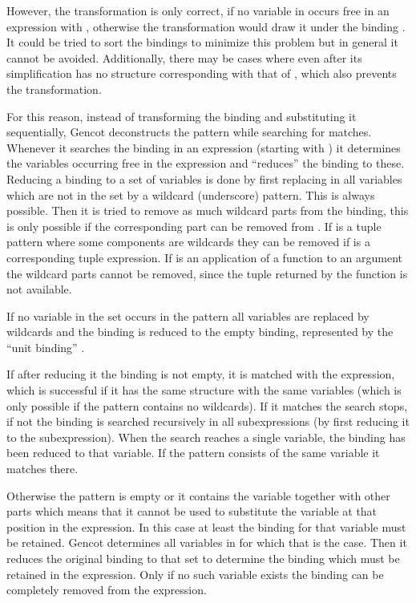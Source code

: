 However, the transformation is only correct, if no variable in  occurs free in an expression  with 
, otherwise the transformation would draw it under the binding . It could be tried to sort
the bindings to minimize this problem but in general it cannot be avoided. Additionally, there may be cases where 
even after its simplification has no structure corresponding with that of , which also prevents the transformation.

For this reason, instead of transforming the binding and substituting it sequentially, Gencot deconstructs the pattern while
searching for matches. Whenever it searches the binding  in an expression (starting with ) 
it determines the variables occurring free in the expression and ``reduces'' the binding to these. Reducing a binding to
a set of variables is done by first replacing in  all variables which are not in the set by a wildcard (underscore) 
pattern. This is always possible. Then it is tried to remove as much wildcard parts from the binding, this is only possible if
the corresponding part can be removed from . If  is a tuple pattern where some components are wildcards
they can be removed if  is a corresponding tuple expression. If  is an application of a function to
an argument the wildcard parts cannot be removed, since the tuple returned by the function is not available.

If no variable in the set occurs in the pattern all variables are replaced by wildcards and the binding is reduced to the 
empty binding, represented by the ``unit binding'' \code{() = ()}.

If after reducing it the binding is not empty, it is matched with the expression, which is successful if it has the same structure with the same
variables (which is only possible if the pattern contains no wildcards). If it matches the search stops, if not the binding 
is searched recursively in all subexpressions (by first reducing it to the subexpression). When the search reaches a single 
variable, the binding has been reduced to that variable. If the pattern consists of the same variable it matches there.

Otherwise the pattern is empty or it contains the variable together with other parts which means that it cannot be used to substitute the 
variable at that position in the expression. In this case at least the binding for that variable must be retained. Gencot 
determines all variables in  for which that is the case. Then it reduces the original binding 
to that set to determine the binding  which must be retained in the  expression. Only if no
such variable exists the binding can be completely removed from the  expression.

